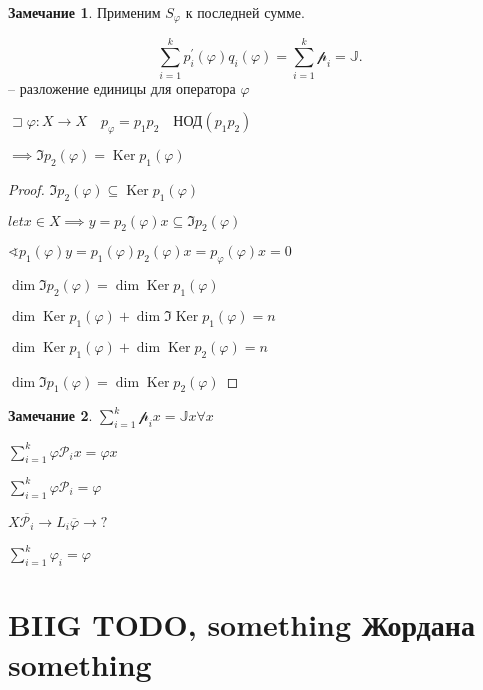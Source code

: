 \documentclass{book}
\newcommand{\p}[1]{#1^{\prime}}
\newcommand{\ov}[1]{\overline{#1}}
\DeclareMathOperator{\Ker}{Ker}
\theoremstyle{definition}
\newtheorem*{note}{Замечание}
\begin{document}
\begin{note}
    Применим $S_{\varphi}$ к последней сумме.

     \[
         \sum_{i=1}^{k} \p p_i\left( \varphi \right) q_i\left( \varphi \right)  = \sum_{i=1}^{k} \mathscr{p}_i = \mathds{J}
    .\] -- разложение единицы для оператора $\varphi$ 
\end{note}

\begin{theorem}

    $\sqsupset \varphi:X\to X\quad p_{\varphi} = p_1p_2\quad \text{НОД}\left( p_1p_2 \right) $ 

    $\implies \Im p_2\left( \varphi \right)  = \Ker p_1\left( \varphi \right) $
\end{theorem}
\begin{proof}
    $\Im p_2\left( \varphi \right) \subseteq \Ker p_1\left( \varphi \right)$

    $let x \in X \implies y =  p_2\left( \varphi \right) x\subseteq \Im p_2\left( \varphi \right) $

    $\sphericalangle p_1\left( \varphi \right) y = p_1\left( \varphi \right) p_2\left( \varphi \right) x = p_{\varphi}\left( \varphi \right) x = 0$

    $\dim \Im p_2\left( \varphi \right)  = \dim \Ker p_1\left( \varphi \right) $ 

    $\dim \Ker p_1\left( \varphi \right)  + \dim \Im \Ker p_1\left( \varphi \right)  = n$ 

    $\dim \Ker p_1\left( \varphi \right) + \dim \Ker p_2\left( \varphi \right)  = n$

    $\dim \Im p_1\left( \varphi \right)  = \dim \Ker p_2\left( \varphi \right) $
\end{proof}

\begin{note}
    $\sum_{i=1}^{k} \mathscr{p}_ix = \mathds{J}x \forall x$ 

    $\sum_{i=1}^{k} \varphi\mathscr{P}_ix = \varphi x$ 

    $\sum_{i=1}^{k} \varphi \mathscr{P}_i = \varphi$ 

    $X \ov{\mathcal{P}_i}{\longrightarrow}L_i \ov{\varphi}{\longrightarrow}?$

     $\sum_{i=1}^{k} \varphi_i = \varphi$
\end{note}
\section{BIIG TODO, something Жордана something}
\end{document}

